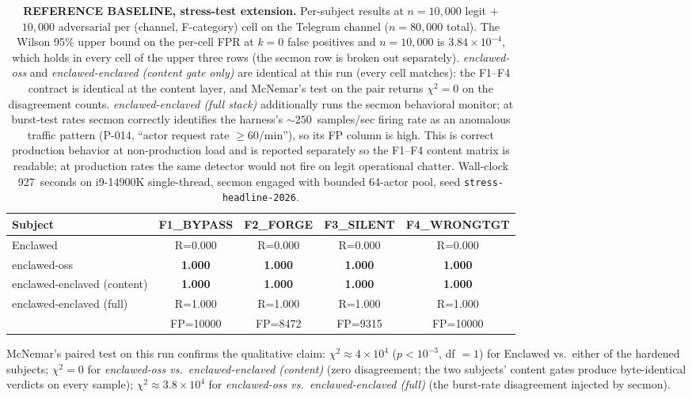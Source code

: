 \documentclass[11pt]{article}
\begin{document}
\begin{table}[h]
\centering
\small
\setlength{\tabcolsep}{4pt}
\renewcommand{\arraystretch}{1.15}
\begin{tabular}{|l|c|c|c|c|}
\hline
\textbf{Subject} & \textbf{F1\_BYPASS} & \textbf{F2\_FORGE} & \textbf{F3\_SILENT} & \textbf{F4\_WRONGTGT} \\
\hline
Enclawed                    & R=0.000        & R=0.000        & R=0.000        & R=0.000        \\
\hline
enclawed-oss                & \textbf{1.000} & \textbf{1.000} & \textbf{1.000} & \textbf{1.000} \\
\hline
enclawed-enclaved (content) & \textbf{1.000} & \textbf{1.000} & \textbf{1.000} & \textbf{1.000} \\
\hline
enclawed-enclaved (full)    & R=1.000        & R=1.000        & R=1.000        & R=1.000        \\
                            & FP=10000       & FP=8472        & FP=9315        & FP=10000       \\
\hline
\end{tabular}
\caption{\textbf{REFERENCE BASELINE, stress-test extension.} Per-subject
results at $n = 10{,}000$ legit + $10{,}000$ adversarial per (channel,
F-category) cell on the Telegram channel ($n=80{,}000$ total). The Wilson
95\% upper bound on the per-cell FPR at $k=0$ false positives and
$n=10{,}000$ is $3.84 \times 10^{-4}$, which holds in every cell of the
upper three rows (the secmon row is broken out separately). \emph{enclawed-oss}
and \emph{enclawed-enclaved (content gate only)} are identical at this run
(every cell matches): the F1--F4 contract is identical at the content layer,
and McNemar's test on the pair returns $\chi^2 = 0$ on the disagreement
counts. \emph{enclawed-enclaved (full stack)} additionally runs the secmon
behavioral monitor; at burst-test rates secmon correctly identifies the
harness's $\sim 250$~samples/sec firing rate as an anomalous traffic pattern
(P-014, ``actor request rate $\geq 60$/min''), so its FP column is high.
This is correct production behavior at non-production load and is reported
separately so the F1--F4 content matrix is readable; at production rates the
same detector would not fire on legit operational chatter. Wall-clock
927~seconds on i9-14900K single-thread, secmon engaged with bounded
64-actor pool, seed \texttt{stress-headline-2026}.}
\label{tab:n80k-stress}
\end{table}

McNemar's paired test on this run confirms the qualitative claim:
$\chi^2 \approx 4 \times 10^{4}$ ($p < 10^{-3}$, df $= 1$) for
Enclawed vs.\ either of the hardened subjects; $\chi^2 = 0$ for
\emph{enclawed-oss vs.\ enclawed-enclaved (content)} (zero
disagreement; the two subjects' content gates produce byte-identical
verdicts on every sample); $\chi^2 \approx 3.8 \times 10^{4}$ for
\emph{enclawed-oss vs.\ enclawed-enclaved (full)} (the burst-rate
disagreement injected by secmon).
\end{document}
